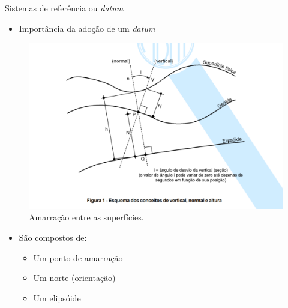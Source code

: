 \documentclass[9pt,ignorenonframetext,]{beamer}
\providecommand{\tightlist}{%
  \setlength{\itemsep}{0pt}\setlength{\parskip}{0pt}}
\begin{document}
\begin{frame}[t]{Sistemas de referência ou \emph{datum}}
\protect\hypertarget{sistemas-de-referuxeancia-ou-datum}{}

\begin{itemize}[<+->]
\tightlist
\item
  Importância da adoção de um \emph{datum}
\end{itemize}

\begin{figure}[H]

{\centering \includegraphics[width=0.5\linewidth]{images/nbr-14.166-datum-elipsoide-1024x668} 

}

\caption{Amarração entre as superfícies.}\label{fig:unnamed-chunk-7}
\end{figure}

\begin{itemize}[<+->]
\tightlist
\item
  São compostos de:

  \begin{itemize}[<+->]
  \tightlist
  \item
    Um ponto de amarração
  \item
    Um norte (orientação)
  \item
    Um elipsóide
  \end{itemize}
\end{itemize}

\end{frame}
\end{document}
